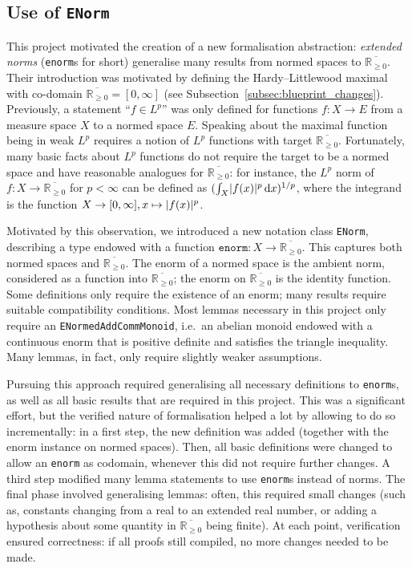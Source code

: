 \documentclass[12pt]{amsart}
\newcommand{\lean}[1]{\texttt{#1}}
\DeclarePairedDelimiter{\abs}{\lvert}{\rvert}
\newcommand*{\ud}{\, \mathrm{d}}
\newcommand*{\real}{\mathbb{R}} %
\newcommand{\ennreal}{\overline{\real_{\ge0}}}
\begin{document}
\subsection{Use of \texttt{ENorm}}\label{subsec:enorm}

This project motivated the creation of a new formalisation abstraction: \emph{extended norms} (\lean{enorm}s for short) generalise many results from normed spaces to $\ennreal$.
Their introduction was motivated by defining the Hardy--Littlewood maximal with co-domain $\ennreal=[0,\infty]$ (see Subsection~\ref{subsec:blueprint_changes}).
Previously, a statement ``$f\in L^p$'' was only defined for functions $f\colon X\to E$ from a measure space $X$ to a normed space $E$. Speaking about the maximal function being in weak $L^p$ requires a notion of $L^p$ functions with target $\ennreal$. Fortunately, many basic facts about $L^p$ functions do not require the target to be a normed space and have reasonable analogues for $\ennreal$: for instance, the $L^p$ norm of $f\colon X\to\ennreal$ for $p<\infty$ can be defined as $(\int_X \abs{f(x)}^p \ud x)^{1/p}$, where the integrand is the function $X\to[0,\infty], x\mapsto \abs{f(x)}^p$.

Motivated by this observation, we introduced a new notation class \lean{ENorm}, describing a type endowed with a function $\texttt{enorm}\colon X\to\ennreal$.
This captures both normed spaces and $\ennreal$. The enorm of a normed space is the ambient norm, considered as a function into $\ennreal$; the enorm on $\ennreal$ is the identity function.
Some definitions only require the existence of an enorm; many results require suitable compatibility conditions. %
Most lemmas necessary in this project only require an \lean{ENormedAddCommMonoid}, i.e.\ an abelian monoid endowed with a continuous enorm that is positive definite and satisfies the triangle inequality. Many lemmas, in fact, only require slightly weaker assumptions. %

Pursuing this approach required generalising all necessary definitions to \lean{enorm}s, as well as all basic results that are required in this project. This was a significant effort, but the verified nature of formalisation helped a lot by allowing to do so incrementally: in a first step, the new definition was added (together with the enorm instance on normed spaces). Then, all basic definitions were changed to allow an \lean{enorm} as codomain, whenever this did not require further changes. A third step modified many lemma statements to use \lean{enorm}s instead of norms.
The final phase involved generalising lemmas: often, this required small changes (such as, constants changing from a real to an extended real number, or adding a hypothesis about some quantity in $\ennreal$ being finite). At each point, verification ensured correctness: if all proofs still compiled, no more changes needed to be made.
\end{document}
